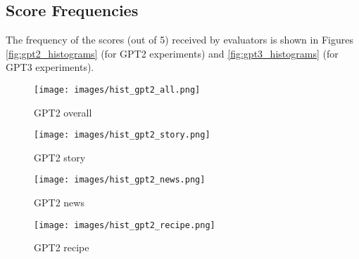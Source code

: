 \begin{comment}
 & Some ($\leq10$) & 346 & 522 \\
 & Many ($>10$) & 150 & 191 \\
 \midrule
\multirow{4}{*}{Gender} & Female & 402 & 583 \\
 & Male & 360 & 573 \\
 & Non-binary & 7 & 11 \\
 & Prefer not to say & 11 & 3 \\
 \bottomrule
\end{tabular}
\caption{Participant demographics for \S\ref{sec:exp_1} and \S\ref{sec:exp_2}.}
\label{tab:demographics}
\end{table}
\end{comment}

\subsection{Score Frequencies}\label{app:exp1_histograms}
The frequency of the scores (out of 5) received by evaluators is shown in Figures \ref{fig:gpt2_histograms} (for GPT2 experiments) and \ref{fig:gpt3_histograms} (for GPT3 experiments).
\begin{figure*}[h]
     \centering
     \begin{subfigure}[b]{0.24\textwidth}
         \centering
         \texttt{[image: images/hist\_gpt2\_all.png]}
         \caption{GPT2 overall}
         \label{fig:hist_gpt2_all}
     \end{subfigure}
     \hfill
     \begin{subfigure}[b]{0.24\textwidth}
         \centering
         \texttt{[image: images/hist\_gpt2\_story.png]}
         \caption{GPT2 story}
         \label{fig:hist_gpt2_story}
     \end{subfigure}
     \hfill
     \begin{subfigure}[b]{0.24\textwidth}
         \centering
         \texttt{[image: images/hist\_gpt2\_news.png]}
         \caption{GPT2 news}
         \label{fig:hist_gpt2_news}
     \end{subfigure}
      \hfill
     \begin{subfigure}[b]{0.24\textwidth}
         \centering
         \texttt{[image: images/hist\_gpt2\_recipe.png]}
         \caption{GPT2 recipe}
         \label{fig:hist_gpt2_recipe}
     \end{subfigure}
        \caption{Histogram of scores classifying human and GPT2 texts.}
        \label{fig:gpt2_histograms}
\end{figure*}

